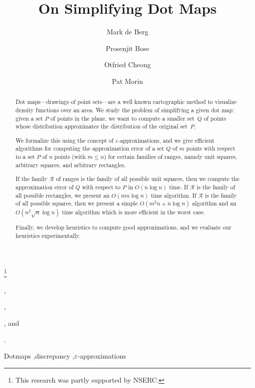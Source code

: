 \documentclass{elsart}
\newcommand{\eps}{\varepsilon}               %
\newcommand{\ranges}{{\mathcal R}}
\begin{document}
\begin{frontmatter}
\title{On Simplifying Dot Maps}
\thanks[nserc]{This research was partly supported by NSERC.}

\author[eindhoven]{Mark de Berg}, 
\author[carleton]{Prosenjit Bose}, 
\author[eindhoven]{Otfried Cheong}, and 
\author[carleton]{Pat Morin}

\address[eindhoven]{Department of Computer Science, TU Eindhoven, PO
Box 513, 5300 MB Eindhoven, the Netherlands}
\address[carleton]{School of Computer Science,
          Carleton University, 
          1125 Colonel By Drive, Ottawa, Ontario, Canada
          K1S 5B6}.
	  
\begin{abstract}
  Dot maps---drawings of point sets---are a well known cartographic method
  to visualize density functions over an area. We study the problem of
  simplifying a given dot map: given a set $P$ of points in the plane,
  we want to compute a smaller set~$Q$ of points whose distribution
  approximates the distribution of the original set~$P$.

  We formalize this using the concept of $\eps$-approximations, and we
  give efficient algorithms for computing the approximation error of a set $Q$
  of $m$ points with respect to a set $P$ of $n$ points (with $m \leq n$)
  for certain families of ranges, namely unit squares,
  arbitrary squares, and arbitrary rectangles.

  If the family $\ranges$ of ranges is the family of all possible unit
  squares, then we compute the approximation error of $Q$ with respect
  to $P$ in $O(n\log n)$ time. If $\ranges$ is the family of all
  possible rectangles, we present an $O(mn\log n)$ time algorithm.  If
  $\ranges$ is the family of all possible squares, then we present a
  simple $O(m^2n + n \log n)$ algorithm and an $O(n^2\sqrt{n}\log n)$
  time algorithm which is more efficient in the worst case.

  Finally, we develop heuristics to compute
  good approximations, and we evaluate our heuristics experimentally.
\end{abstract}

\begin{keyword}
Dotmaps \sep discrepancy \sep $\eps$-approximations
\end{keyword}
\end{frontmatter}

\end{document}
